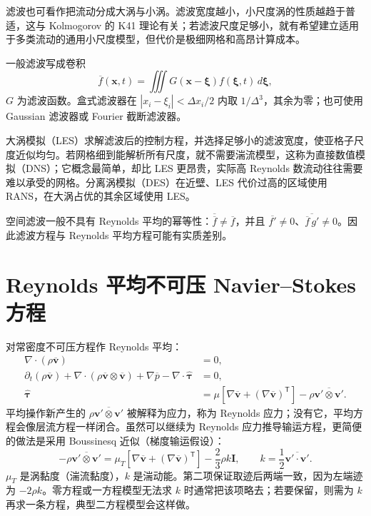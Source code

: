 \documentclass[11pt,a4paper,openany,fontset=none]{ctexbook}
\begin{document}
滤波也可看作把流动分成大涡与小涡。滤波宽度越小，小尺度涡的性质越趋于普适，这与 Kolmogorov 的 K41 理论有关；若滤波尺度足够小，就有希望建立适用于多类流动的通用小尺度模型，但代价是极细网格和高昂计算成本。

一般滤波写成卷积
\begin{equation}
 \overline f(\bm x,t)=\iiint G(\bm x-\bm\xi)f(\bm\xi,t)\,d\bm\xi, \tag{5.1.22}
\end{equation}
$G$ 为滤波函数。盒式滤波器在 $|x_i-\xi_i|<\Delta x_i/2$ 内取 $1/\Delta^3$，其余为零；也可使用 Gaussian 滤波器或 Fourier 截断滤波器。

大涡模拟（LES）求解滤波后的控制方程，并选择足够小的滤波宽度，使亚格子尺度近似均匀。若网格细到能解析所有尺度，就不需要湍流模型，这称为直接数值模拟（DNS）；它概念最简单，却比 LES 更昂贵，实际高 Reynolds 数流动往往需要难以承受的网格。分离涡模拟（DES）在近壁、LES 代价过高的区域使用 RANS，在大涡占优的其余区域使用 LES。

空间滤波一般不具有 Reynolds 平均的幂等性：$\overline{\overline f}\ne\overline f$，并且 $\overline{f'}\ne0$、$\overline{\overline f\,g'}\ne0$。因此滤波方程与 Reynolds 平均方程可能有实质差别。

\section{Reynolds 平均不可压 Navier--Stokes 方程}

对常密度不可压方程作 Reynolds 平均：
\begin{align}
 \nabla\cdot(\rho\overline{\bm v})&=0, \tag{5.2.1}\\
 \partial_t(\rho\overline{\bm v})+
 \nabla\cdot(\rho\overline{\bm v}\otimes\overline{\bm v})+
 \nabla\overline p-\nabla\cdot\widehat{\bm\tau}&=0, \tag{5.2.2}\\
 \widehat{\bm\tau}&=\mu[\nabla\overline{\bm v}+(\nabla\overline{\bm v})^{\mathsf T}]
 -\rho\overline{\bm v'\otimes\bm v'}. \tag{5.2.3}
\end{align}
平均操作新产生的 $\rho\overline{\bm v'\otimes\bm v'}$ 被解释为应力，称为 Reynolds 应力；没有它，平均方程会像层流方程一样闭合。虽然可以继续为 Reynolds 应力推导输运方程，更简便的做法是采用 Boussinesq 近似（梯度输运假设）：
\begin{equation}
 -\rho\overline{\bm v'\otimes\bm v'}
 =\mu_T[\nabla\overline{\bm v}+(\nabla\overline{\bm v})^{\mathsf T}]
 -\frac23\rho k\bm I,\qquad
 k=\frac12\overline{\bm v'\cdot\bm v'}. \tag{5.2.5--5.2.6}
\end{equation}
$\mu_T$ 是涡黏度（湍流黏度），$k$ 是湍动能。第二项保证取迹后两端一致，因为左端迹为 $-2\rho k$。零方程或一方程模型无法求 $k$ 时通常把该项略去；若要保留，则需为 $k$ 再求一条方程，典型二方程模型会这样做。
\end{document}
